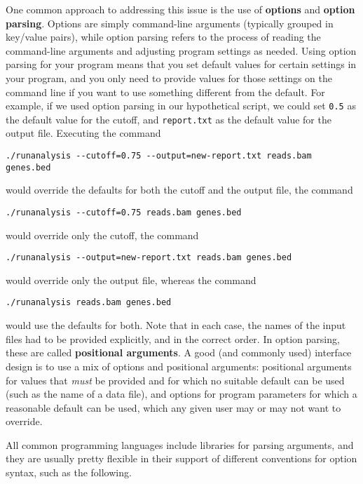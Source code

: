 \documentclass{article}
\begin{document}
One common approach to addressing this issue is the use of \textbf{options} and \textbf{option parsing}. Options are simply command-line arguments (typically grouped in key/value pairs), while option parsing refers to the process of reading the command-line arguments and adjusting program settings as needed. Using option parsing for your program means that you set default values for certain settings in your program, and you only need to provide values for those settings on the command line if you want to use something different from the default. For example, if we used option parsing in our hypothetical script, we could set \texttt{0.5} as the default value for the cutoff, and \texttt{report.txt} as the default value for the output file. Executing the command
\begin{verbatim}
./runanalysis --cutoff=0.75 --output=new-report.txt reads.bam genes.bed
\end{verbatim}
would override the defaults for both the cutoff and the output file, the command
\begin{verbatim}
./runanalysis --cutoff=0.75 reads.bam genes.bed
\end{verbatim}
would override only the cutoff, the command
\begin{verbatim}
./runanalysis --output=new-report.txt reads.bam genes.bed
\end{verbatim}
would override only the output file, whereas the command
\begin{verbatim}
./runanalysis reads.bam genes.bed
\end{verbatim}
would use the defaults for both. Note that in each case, the names of the input files had to be provided explicitly, and in the correct order. In option parsing, these are called \textbf{positional arguments}. A good (and commonly used) interface design is to use a mix of options and positional arguments: positional arguments for values that \textit{must} be provided and for which no suitable default can be used (such as the name of a data file), and options for program parameters for which a reasonable default can be used, which any given user may or may not want to override.

All common programming languages include libraries for parsing arguments, and they are usually pretty flexible in their support of different conventions for option syntax, such as the following.
\end{document}
